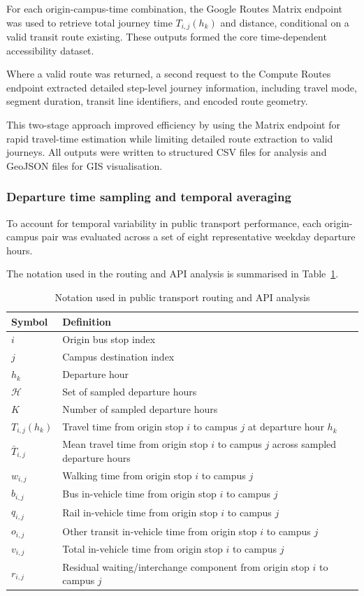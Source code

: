 \documentclass[11pt,a4paper]{article}
\begin{document}
For each origin-campus-time combination, the Google Routes Matrix endpoint was used to retrieve total journey time \(T_{i,j}(h_k)\) and distance, conditional on a valid transit route existing. These outputs formed the core time-dependent accessibility dataset.

Where a valid route was returned, a second request to the Compute Routes endpoint extracted detailed step-level journey information, including travel mode, segment duration, transit line identifiers, and encoded route geometry.

This two-stage approach improved efficiency by using the Matrix endpoint for rapid travel-time estimation while limiting detailed route extraction to valid journeys. All outputs were written to structured CSV files for analysis and GeoJSON files for GIS visualisation.

\subsubsection{Departure time sampling and temporal averaging}

To account for temporal variability in public transport performance, each origin-campus pair was evaluated across a set of eight representative weekday departure hours.

The notation used in the routing and API analysis is summarised in Table~\ref{tab:routing_notation}.

\begin{table}[H]
\centering
\small
\caption{Notation used in public transport routing and API analysis}
\label{tab:routing_notation}
\renewcommand{\arraystretch}{1.25}
\begin{tabular}{ll}
\hline
Symbol & Definition \\
\hline
$i$ & Origin bus stop index \\
$j$ & Campus destination index \\
$h_k$ & Departure hour \\
$\mathcal{H}$ & Set of sampled departure hours \\
$K$ & Number of sampled departure hours \\
$T_{i,j}(h_k)$ & Travel time from origin stop $i$ to campus $j$ at departure hour $h_k$ \\
$\bar{T}_{i,j}$ & Mean travel time from origin stop $i$ to campus $j$ across sampled departure hours \\
$w_{i,j}$ & Walking time from origin stop $i$ to campus $j$ \\
$b_{i,j}$ & Bus in-vehicle time from origin stop $i$ to campus $j$ \\
$q_{i,j}$ & Rail in-vehicle time from origin stop $i$ to campus $j$ \\
$o_{i,j}$ & Other transit in-vehicle time from origin stop $i$ to campus $j$ \\
$v_{i,j}$ & Total in-vehicle time from origin stop $i$ to campus $j$ \\
$r_{i,j}$ & Residual waiting/interchange component from origin stop $i$ to campus $j$ \\
\hline
\end{tabular}
\renewcommand{\arraystretch}{1}
\end{table}
\end{document}
